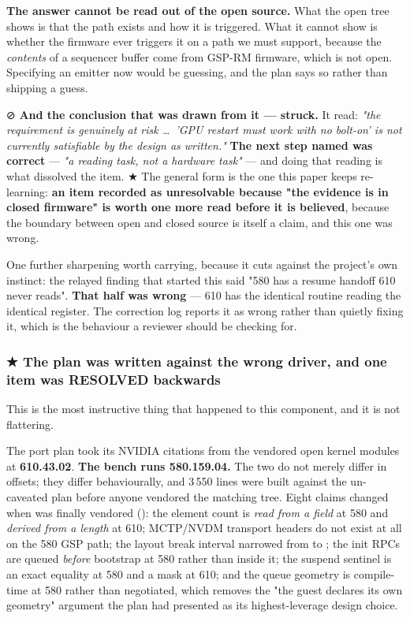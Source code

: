 \documentclass[10.5pt]{article}
\begin{document}
\textbf{The answer cannot be read out of the open source.} What the open tree shows is that the
path exists and how it is triggered. What it cannot show is whether the firmware ever triggers it
on a path we must support, because the \emph{contents} of a sequencer buffer come from GSP-RM
firmware, which is not open. Specifying an emitter now would be guessing, and the plan says so
rather than shipping a guess.

⊘ \textbf{And the conclusion that was drawn from it — struck.} It read: \emph{"the requirement is
genuinely at risk \dots\ 'GPU restart must work with no bolt-on' is not currently satisfiable by
the design as written."} \textbf{The next step named was correct} — \emph{"a reading task, not a
hardware task"} — and doing that reading is what dissolved the item. ★ The general form is the one
this paper keeps re-learning: \textbf{an item recorded as unresolvable because "the evidence is in
closed firmware" is worth one more read before it is believed}, because the boundary between open
and closed source is itself a claim, and this one was wrong.

One further sharpening worth carrying, because it cuts against the project's own instinct: the
relayed finding that started this said "580 has a resume handoff 610 never reads". \textbf{That
half was wrong} — 610 has the identical routine reading the identical register. The correction log
reports it as wrong rather than quietly fixing it, which is the behaviour a reviewer should be
checking for.

\subsubsection*{\texorpdfstring{★ The plan was written against the wrong driver, and one item was RESOLVED backwards}{The plan was written against the wrong driver, and one item was RESOLVED backwards}}

This is the most instructive thing that happened to this component, and it is not flattering.

The port plan took its NVIDIA citations from the vendored open kernel modules at
\textbf{610.43.02}. \textbf{The bench runs 580.159.04.} The two do not merely differ in offsets;
they differ behaviourally, and 3\,550 lines were built against the un-caveated plan before anyone
vendored the matching tree. Eight claims changed when  was finally vendored
(): the element count is \emph{read from a field} at 580 and \emph{derived from a
length} at 610; MCTP/NVDM transport headers do not exist at all on the 580 GSP path; the layout
break interval narrowed from \code{(570, 610]} to \code{(595.84, 610.43.02]}; the init RPCs are
queued \emph{before} bootstrap at 580 rather than inside it; the suspend sentinel is an exact
equality at 580 and a mask at 610; and the queue geometry is compile-time at 580 rather than
negotiated, which removes the "the guest declares its own geometry" argument the plan had
presented as its highest-leverage design choice.
\end{document}

